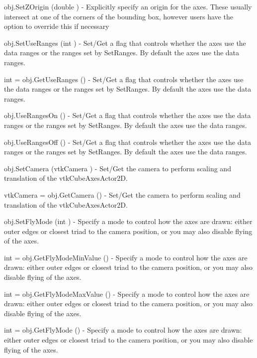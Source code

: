 \begin{DoxyItemize}
\item {\ttfamily obj.\-Set\-Z\-Origin (double )} -\/ Explicitly specify an origin for the axes. These usually intersect at one of the corners of the bounding box, however users have the option to override this if necessary  
\item {\ttfamily obj.\-Set\-Use\-Ranges (int )} -\/ Set/\-Get a flag that controls whether the axes use the data ranges or the ranges set by Set\-Ranges. By default the axes use the data ranges.  
\item {\ttfamily int = obj.\-Get\-Use\-Ranges ()} -\/ Set/\-Get a flag that controls whether the axes use the data ranges or the ranges set by Set\-Ranges. By default the axes use the data ranges.  
\item {\ttfamily obj.\-Use\-Ranges\-On ()} -\/ Set/\-Get a flag that controls whether the axes use the data ranges or the ranges set by Set\-Ranges. By default the axes use the data ranges.  
\item {\ttfamily obj.\-Use\-Ranges\-Off ()} -\/ Set/\-Get a flag that controls whether the axes use the data ranges or the ranges set by Set\-Ranges. By default the axes use the data ranges.  
\item {\ttfamily obj.\-Set\-Camera (vtk\-Camera )} -\/ Set/\-Get the camera to perform scaling and translation of the vtk\-Cube\-Axes\-Actor2\-D.  
\item {\ttfamily vtk\-Camera = obj.\-Get\-Camera ()} -\/ Set/\-Get the camera to perform scaling and translation of the vtk\-Cube\-Axes\-Actor2\-D.  
\item {\ttfamily obj.\-Set\-Fly\-Mode (int )} -\/ Specify a mode to control how the axes are drawn\-: either outer edges or closest triad to the camera position, or you may also disable flying of the axes.  
\item {\ttfamily int = obj.\-Get\-Fly\-Mode\-Min\-Value ()} -\/ Specify a mode to control how the axes are drawn\-: either outer edges or closest triad to the camera position, or you may also disable flying of the axes.  
\item {\ttfamily int = obj.\-Get\-Fly\-Mode\-Max\-Value ()} -\/ Specify a mode to control how the axes are drawn\-: either outer edges or closest triad to the camera position, or you may also disable flying of the axes.  
\item {\ttfamily int = obj.\-Get\-Fly\-Mode ()} -\/ Specify a mode to control how the axes are drawn\-: either outer edges or closest triad to the camera position, or you may also disable flying of the axes.  

\end{DoxyItemize}

